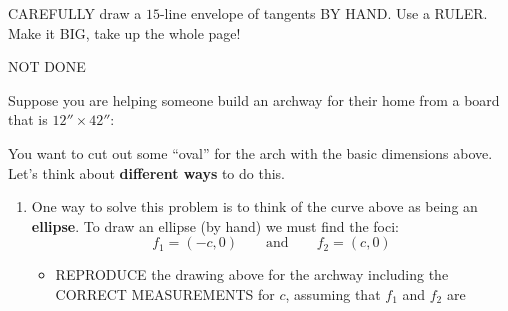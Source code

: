 \documentclass[noauthor,nooutcomes,hints]{ximera}
\begin{document}
\mynewpage






\begin{question}
  CAREFULLY draw a $15$-line envelope of tangents BY HAND. Use a
  RULER. Make it BIG, take up the whole page!
  \begin{freeResponse}
    NOT DONE
  \end{freeResponse}
\end{question}
\mynewpage





\begin{question}
  Suppose you are helping someone build an archway for their home from
  a board that is $12''\times 42''$:
  \begin{center}
  \end{center}
  You want to cut out some ``oval'' for the arch with the basic
  dimensions above. Let's think about \textbf{different ways} to do
  this.
  \begin{enumerate}
  \item One way to solve this problem is to think of the curve above
    as being an \textbf{ellipse}. To draw an ellipse (by hand) we must
    find the foci:
    \[
    f_1 = (-c,0) \qquad \text{and} \qquad f_2 = (c,0)
    \]
    \begin{itemize}
    \item REPRODUCE the drawing above for the archway including the
      CORRECT MEASUREMENTS for $c$, assuming that $f_1$ and $f_2$ are

\end{itemize}
\end{enumerate}
\end{question}
\end{document}
